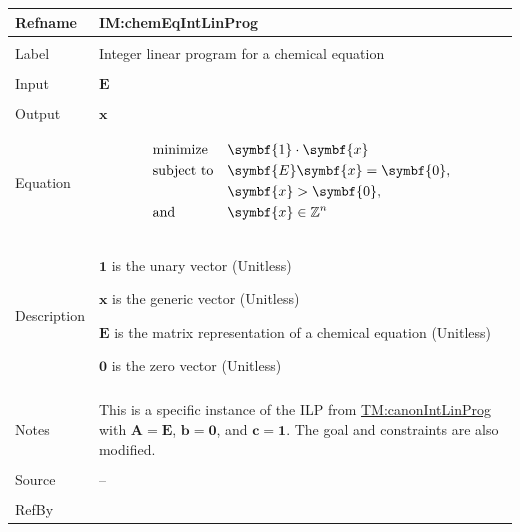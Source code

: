 \documentclass[12pt]{article}
\newcommand{\gt}{\ensuremath >}
\begin{document}
\vspace{\baselineskip}
\noindent
\begin{minipage}{\textwidth}
\begin{tabular}{>{\raggedright}p{}>{\raggedright\arraybackslash}p{}}
\toprule \textbf{Refname} & \textbf{IM:chemEqIntLinProg}
\label{IM:chemEqIntLinProg}
\\ \midrule \\
Label & Integer linear program for a chemical equation
        
\\ \midrule \\
Input & $\symbf{E}$
        
\\ \midrule \\
Output & $\symbf{x}$
         
\\ \midrule \\
Equation & \begin{displaymath}
           \begin{aligned}
            & \text{minimize} &  & \symbf{1}\cdot{}\symbf{x}\\
            & \text{subject to} &  & \symbf{E} \symbf{x}=\symbf{0},\\
            & \, &  & \symbf{x}\gt{}\symbf{0},\\
            & \text{and} &  & \symbf{x}\in{}\mathbb{Z}^{n}
           \end{aligned}
           \end{displaymath}
\\ \midrule \\
Description & \begin{symbDescription}
              \item{$\symbf{1}$ is the unary vector (Unitless)}
              \item{$\symbf{x}$ is the generic vector (Unitless)}
              \item{$\symbf{E}$ is the matrix representation of a chemical equation (Unitless)}
              \item{$\symbf{0}$ is the zero vector (Unitless)}
              \end{symbDescription}
\\ \midrule \\
Notes & This is a specific instance of the ILP from \hyperref[TM:canonIntLinProg]{TM:canonIntLinProg} with $\symbf{A}=\symbf{E}$, $\symbf{b}=\symbf{0}$, and $\symbf{c}=\symbf{1}$. The goal and constraints are also modified.
        
\\ \midrule \\
Source & --
         
\\ \midrule \\
RefBy & 
\\ \bottomrule
\end{tabular}
\end{minipage}
\end{document}
